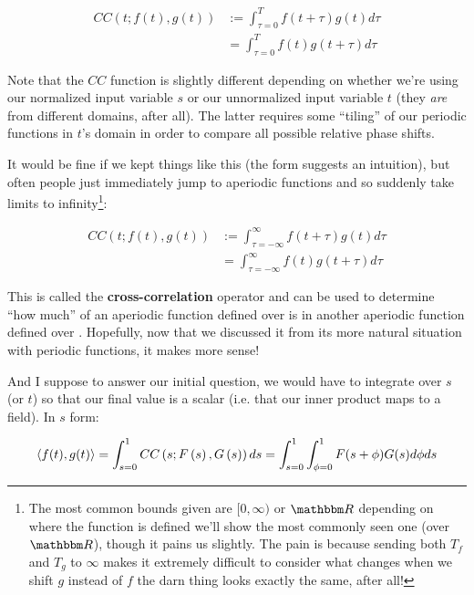 \documentclass[../main/main.tex]{subfiles}
\begin{document}
\[ \begin{split}
  CC(t; f(t), g(t)) &:= 
    \int_{\tau = 0}^{T} f(t + \tau) g(t) d\tau \\
    &= \int_{\tau = 0}^{T} f(t) g(t + \tau) d\tau
\end{split}
\]

Note that the \(CC\) function is slightly different depending
on whether we're using our normalized input variable \(s\) or
our unnormalized input variable \(t\) (they \emph{are}
from different domains, after all). The latter
requires some ``tiling'' of our periodic functions in
\(t\)'s domain
in order to compare all possible relative phase shifts.\par

It would be fine if we kept things like this (the form suggests
an intuition), but often people just immediately jump to
aperiodic functions and so suddenly take limits to infinity\footnote
{
  The most common bounds given are
  \([0, \infty)\) or \(\domain{R}\) depending on where
  the function is defined \textemdash{} we'll show the most
  commonly seen one (over \(\domain{R}\)), though it pains us slightly.
  The pain is because sending both \(T_f\) and \(T_g\) to \(\infty\)
  makes it extremely difficult to consider what changes when we
  shift \(g\) instead of \(f\) \textemdash{} the darn thing
  looks exactly the same, after all!
}:

\[ \begin{split}
  CC(t; f(t), g(t)) &:= 
    \int_{\tau = -\infty}^{\infty} f(t + \tau) g(t) d\tau \\
    &= \int_{\tau = -\infty}^{\infty} f(t) g(t + \tau) d\tau
\end{split}
\]

This is called the \textbf{cross-correlation}
operator
and can be used to determine ``how much'' of an aperiodic 
function defined over  is in another aperiodic function 
defined over . Hopefully, now that we discussed it
from its more natural situation with periodic functions,
it makes more sense! \par

And I suppose to answer our initial question,
we would have to integrate over \(s\) (or \(t\)) so that
our final value is a scalar (i.e. that our inner product maps
to a field). In \(s\) form:

\[ \left<f(t),g(t)\right> =
\int_{s=0}^{1}CC\left(s; F\left(s\right), G\left(s\right)\right) ds = 
\int_{s=0}^{1} \int_{\phi = 0}^{1} F(s + \phi) G(s) d\phi ds
\]
\end{document}

